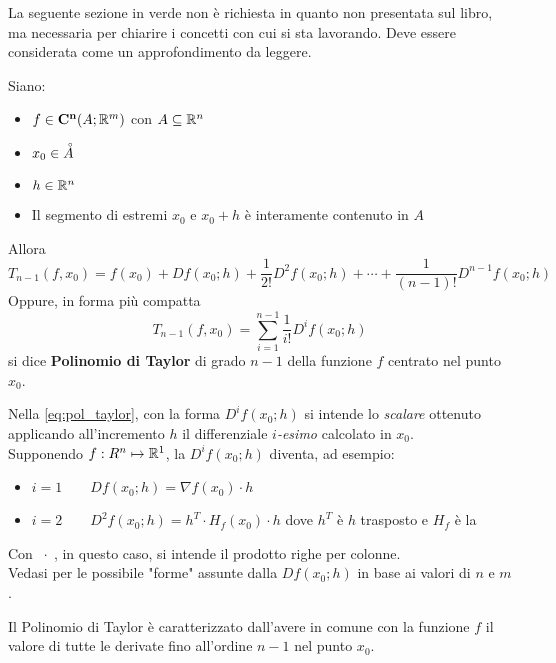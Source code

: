 \vspace*{\baselineskip}
La seguente sezione in \textcolor{not_explained_section_color}{verde} non è richiesta in quanto non presentata sul libro, ma necessaria per chiarire i concetti con cui si sta lavorando. Deve essere considerata come un approfondimento da leggere.
\color{not_explained_section_color}
\begin{definition}
	\label{def:pol_taylor}
	Siano:
	\begin{itemize}[noitemsep]
		\item $f \in \mathbf{C^{n}}(A;\mathbb{R}^m)$ con $A \subseteq \mathbb{R}^n$
		\item $x_0 \in \accentset{\circ}{A}$
		\item $h \in \mathbb{R}^n$
		\item Il segmento di estremi $x_0$ e $x_0 + h$ è interamente contenuto in $A$
	\end{itemize}
	Allora
	\[T_{n-1}(f, x_0) = f(x_0) + Df(x_0; h) + \frac{1}{2!} D^2f(x_0; h) + \cdots + \frac{1}{(n-1)!} D^{n-1}f(x_0; h)\]
	Oppure, in forma più compatta
	\begin{equation}
		\label{eq:pol_taylor}
			T_{n-1}(f, x_0) = \sum\limits_{i = 1}^{n-1} \frac{1}{i!} D^if(x_0; h)
	\end{equation}
	si dice \textbf{Polinomio di Taylor} di grado $n-1$ della funzione $f$ centrato nel punto $x_0$.

	\begin{note}
		Nella \cref{eq:pol_taylor}, con la forma $D^if(x_0; h)$ si intende lo \textit{scalare} ottenuto applicando all’incremento $h$ il differenziale $i$\textit{-esimo} calcolato in $x_0$.\\
		Supponendo $f: R^n \mapsto \mathbb{R}^1$, la $D^if(x_0; h)$ diventa, ad esempio:
		\begin{itemize}
			\item $i = 1 \qquad Df(x_0; h) = \nabla f(x_0) \cdot h$
			\item $i = 2 \qquad D^2f(x_0; h) = h^T \cdot H_f(x_0) \cdot h$ \quad dove $h^T$ è $h$ trasposto e $H_f$ è la 
		\end{itemize}
		Con $\; \cdot \;$, in questo caso, si intende il prodotto righe per colonne.\\
		Vedasi  per le possibile "forme" assunte dalla $Df(x_0; h)$ in base ai valori di $n$ e $m$.
	\end{note}
\end{definition}
\begin{observation}
	Il Polinomio di Taylor è caratterizzato dall’avere in comune con la funzione $f$ il valore di tutte le derivate fino all’ordine $n-1$ nel punto $x_0$.
\end{observation}
